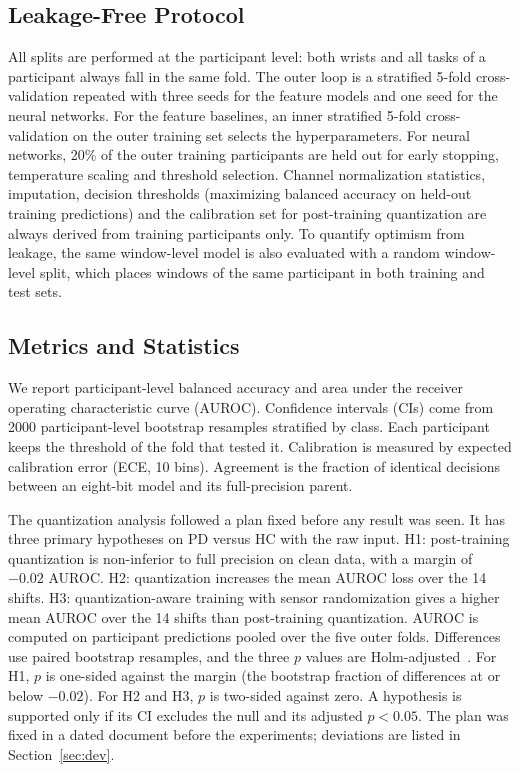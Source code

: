 \documentclass[journal,twoside,web]{ieeecolor}
\begin{document}
\subsection{Leakage-Free Protocol}
All splits are performed at the participant level: both wrists and all tasks of a participant always fall in the same fold. The outer loop is a stratified 5-fold cross-validation repeated with three seeds for the feature models and one seed for the neural networks. For the feature baselines, an inner stratified 5-fold cross-validation on the outer training set selects the hyperparameters. For neural networks, 20\% of the outer training participants are held out for early stopping, temperature scaling and threshold selection. Channel normalization statistics, imputation, decision thresholds (maximizing balanced accuracy on held-out training predictions) and the calibration set for post-training quantization are always derived from training participants only. To quantify optimism from leakage, the same window-level model is also evaluated with a random window-level split, which places windows of the same participant in both training and test sets.

\subsection{Metrics and Statistics}
We report participant-level balanced accuracy and area under the receiver operating characteristic curve (AUROC). Confidence intervals (CIs) come from 2000 participant-level bootstrap resamples stratified by class. Each participant keeps the threshold of the fold that tested it. Calibration is measured by expected calibration error (ECE, 10 bins). Agreement is the fraction of identical decisions between an eight-bit model and its full-precision parent.

The quantization analysis followed a plan fixed before any result was seen. It has three primary hypotheses on PD versus HC with the raw input. H1: post-training quantization is non-inferior to full precision on clean data, with a margin of $-0.02$ AUROC. H2: quantization increases the mean AUROC loss over the 14 shifts. H3: quantization-aware training with sensor randomization gives a higher mean AUROC over the 14 shifts than post-training quantization. AUROC is computed on participant predictions pooled over the five outer folds. Differences use paired bootstrap resamples, and the three $p$ values are Holm-adjusted~\cite{Holm1979}. For H1, $p$ is one-sided against the margin (the bootstrap fraction of differences at or below $-0.02$). For H2 and H3, $p$ is two-sided against zero. A hypothesis is supported only if its CI excludes the null and its adjusted $p<0.05$. The plan was fixed in a dated document before the experiments; deviations are listed in Section~\ref{sec:dev}.
\end{document}

